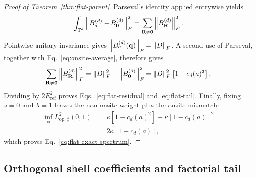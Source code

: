 \begin{proof}[Proof of Theorem~\ref{thm:flat-parent}]
Parseval's identity applied entrywise yields
\begin{equation}
 \int_{\mathbb T^d}\left\lVert B_a^{(d)}-B_{\mathbf0}^{(d)}\right\rVert_F^2
 =\sum_{\mathbf R\ne\mathbf0}\left\lVert B_{\mathbf R}^{(d)}\right\rVert_F^2.
\end{equation}
Pointwise unitary invariance gives
$\left\lVert B_a^{(d)}(\mathbf q)\right\rVert_F=\left\lVert D\right\rVert_F$. A second use of Parseval, together with
Eq.~\eqref{eq:onsite-average}, therefore gives
\begin{equation}
 \sum_{\mathbf R\ne\mathbf0}\left\lVert B_{\mathbf R}^{(d)}\right\rVert_F^2
 =\left\lVert D\right\rVert_F^2-\left\lVert B_{\mathbf0}^{(d)}\right\rVert_F^2
 =\left\lVert D\right\rVert_F^2\left[1-c_d(a)^2\right].
\end{equation}
Dividing by $2E_{\mathrm{ref}}^2$ proves Eqs.~\eqref{eq:flat-residual} and
\eqref{eq:flat-tail}. Finally, fixing $s=0$ and $\lambda=1$ leaves the non-onsite
weight plus the onsite mismatch:
\begin{align}
 \inf_\phi L_{\mathrm{op},\phi}^2(0,1)
 &=\kappa[1-c_d(a)^2]+\kappa[1-c_d(a)]^2\\
 &=2\kappa[1-c_d(a)],
\end{align}
which proves Eq.~\eqref{eq:flat-exact-spectrum}.
\end{proof}

\subsection{Orthogonal shell coefficients and factorial tail}
\label{app:proof-orthogonal-tail}


